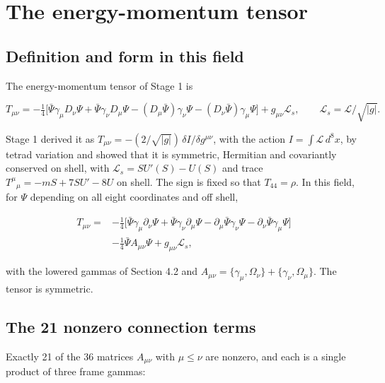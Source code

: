 \documentclass[11pt]{article}
\begin{document}
\section{The energy-momentum tensor}

\subsection{Definition and form in this field}

The energy-momentum tensor of Stage 1 is

\[
T_{\mu\nu}=-\tfrac14\bigl[\bar\Psi\gamma_\mu D_\nu\Psi+\bar\Psi\gamma_\nu D_\mu\Psi-(D_\mu\bar\Psi)\gamma_\nu\Psi-(D_\nu\bar\Psi)\gamma_\mu\Psi\bigr]+g_{\mu\nu}\mathcal L_s,\qquad \mathcal L_s=\mathcal L/\sqrt{|g|}.
\]

Stage 1 derived it as $T_{\mu\nu}=-(2/\sqrt{|g|})\,\delta I/\delta g^{\mu\nu}$, with the action $I=\int\mathcal L\,d^8x$, by tetrad variation and showed that it is symmetric, Hermitian and covariantly conserved on shell, with $\mathcal L_s=SU'(S)-U(S)$ and trace $T^\mu{}_\mu=-mS+7SU'-8U$ on shell. The sign is fixed so that $T_{44}=\rho$. In this field, for $\Psi$ depending on all eight coordinates and off shell,

\[
\begin{aligned}
T_{\mu\nu}={}&-\tfrac14\bigl[\bar\Psi\gamma_\mu\partial_\nu\Psi+\bar\Psi\gamma_\nu\partial_\mu\Psi-\partial_\mu\bar\Psi\gamma_\nu\Psi-\partial_\nu\bar\Psi\gamma_\mu\Psi\bigr] \\
&-\tfrac14\bar\Psi A_{\mu\nu}\Psi+g_{\mu\nu}\mathcal L_s ,
\end{aligned}
\]

with the lowered gammas of Section 4.2 and $A_{\mu\nu}=\{\gamma_\mu,\Omega_\nu\}+\{\gamma_\nu,\Omega_\mu\}$. The tensor is symmetric.

\subsection{The 21 nonzero connection terms}

Exactly 21 of the 36 matrices $A_{\mu\nu}$ with $\mu\le\nu$ are nonzero, and each is a single product of three frame gammas:
\end{document}
